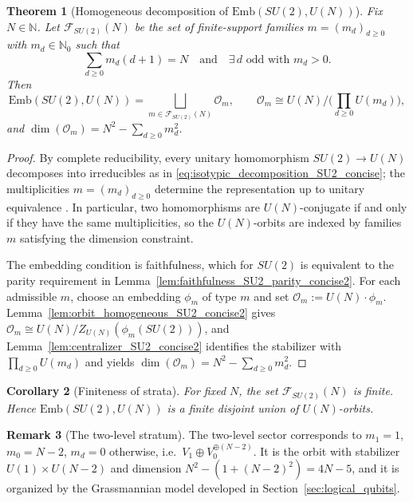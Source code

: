 \documentclass{article}%
\newtheorem{theorem}{Theorem}[section]
\newtheorem{corollary}[theorem]{Corollary}
\theoremstyle{definition}
\newtheorem{remark}[theorem]{Remark}
\numberwithin{equation}{section}
\newcommand{\N}{\mathbb{N}}
\newcommand{\Emb}{\mathrm{Emb}}
\begin{document}
\begin{theorem}[Homogeneous decomposition of $\Emb(SU(2),U(N))$]\label{thm:Emb_SU2_decomposition_main_concise2}
Fix $N\in\N$. Let $\mathscr F_{SU(2)}(N)$ be the set of finite-support families $m=(m_d)_{d\ge0}$ with $m_d\in\N_0$ such that
\[
\sum_{d\ge0} m_d(d+1)=N
\quad\text{and}\quad
\exists\, d \text{ odd with } m_d>0.
\]
Then
\[
\Emb(SU(2),U(N))=\bigsqcup_{m\in\mathscr F_{SU(2)}(N)} \mathcal O_m,
\qquad
\mathcal O_m \cong U(N)\Big/\Big(\prod_{d\ge0}U(m_d)\Big),
\]
and $\dim(\mathcal O_m)=N^2-\sum_{d\ge0}m_d^2$.
\end{theorem}

\begin{proof}
By complete reducibility, every unitary homomorphism $SU(2)\to U(N)$ decomposes into irreducibles as in
\eqref{eq:isotypic_decomposition_SU2_concise}; the multiplicities $m=(m_d)_{d\ge0}$ determine the representation up to unitary
equivalence \cite{BrockerDieck1985,Hall2015,Knapp2002}. In particular, two homomorphisms are $U(N)$-conjugate if and only if they have
the same multiplicities, so the $U(N)$-orbits are indexed by families $m$ satisfying the dimension constraint.

The embedding condition is faithfulness, which for $SU(2)$ is equivalent to the parity requirement in
Lemma~\ref{lem:faithfulness_SU2_parity_concise2}. For each admissible $m$, choose an embedding $\phi_m$ of type $m$ and set
$\mathcal O_m:=U(N)\cdot \phi_m$. Lemma~\ref{lem:orbit_homogeneous_SU2_concise2} gives
$\mathcal O_m\cong U(N)/Z_{U(N)}(\phi_m(SU(2)))$, and Lemma~\ref{lem:centralizer_SU2_concise2} identifies the stabilizer with
$\prod_{d\ge0}U(m_d)$ and yields $\dim(\mathcal O_m)=N^2-\sum_{d\ge0}m_d^2$.
\end{proof}

\begin{corollary}[Finiteness of strata]\label{cor:finiteness_strata_SU2_concise2}
For fixed $N$, the set $\mathscr F_{SU(2)}(N)$ is finite. Hence $\Emb(SU(2),U(N))$ is a finite disjoint union of $U(N)$-orbits.
\end{corollary}

\begin{remark}[The two-level stratum]\label{rem:two_level_stratum_concise}
The two-level sector corresponds to $m_1=1$, $m_0=N-2$, $m_d=0$ otherwise, i.e.\ $V_1\oplus V_0^{\oplus (N-2)}$.
It is the orbit with stabilizer $U(1)\times U(N-2)$ and dimension $N^2-(1+(N-2)^2)=4N-5$, and it is organized by the
Grassmannian model developed in Section~\ref{sec:logical_qubits}.
\end{remark}
\end{document}
